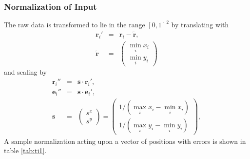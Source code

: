 \documentclass[useAMS,usenatbib]{mn2e}
\begin{document}
\subsubsection{Normalization of Input}
The raw data is transformed to lie in the range $[0,1]^2$ by translating with
%
\begin{eqnarray}\label{eq:translating}
	\mathbf{r}_i' &=& \mathbf{r}_i-\tilde{\mathbf{r}},\\
	\tilde{\mathbf{r}} &=& 	\begin{pmatrix}
					\min_i x_i\\
					\min_i y_i
			       	\end{pmatrix}
\end{eqnarray}
%
and scaling by
%
\begin{eqnarray}\label{eq:scaling}
	\mathbf{r}_i''&=& \mathbf{s}\cdot\mathbf{r}_i',\\
	\mathbf{e}_i''&=& \mathbf{s}\cdot\mathbf{e}_i',\\
	\mathbf{s}   &=& \begin{pmatrix}s^x\\s^y\end{pmatrix}
                      = \begin{pmatrix}
				1/(\max_i x_i-\min_i x_i)\\
				1/(\max_i y_i-\min_i y_i)
			\end{pmatrix},
\end{eqnarray}
%
A sample normalization acting upon a vector of positions with errors
is shown in table \ref{tab:ti1}.
%
\end{document}
